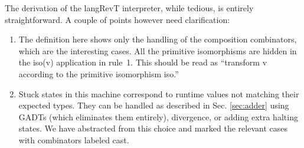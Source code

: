 \documentclass{llncs}
\begin{document}
\begin{center}
\end{center}


The derivation of the {{langRevT}} interpreter, while tedious, is
entirely straightforward.  A couple of points however need clarification:

\begin{enumerate}

\item The definition here shows only the handling of the composition
  combinators, which are the interesting cases. All the primitive
  isomorphisms are hidden in the {{iso(v)}} application in {{rule~1}}. This
  should be read as ``transform {{v}} according to the primitive isomorphism
  {{iso}}.'' 

\item Stuck states in this machine correspond to runtime values not
  matching their expected types. They can be handled as described in
  Sec. \ref{sec:adder} using GADTs (which eliminates them entirely),
  divergence, or adding extra halting states. We have abstracted from
  this choice and marked the relevant cases with combinators labeled
  {{cast}}.

\end{enumerate}
\end{document}
